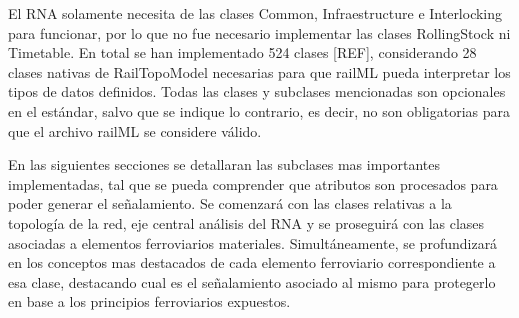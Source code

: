     
    
    
    El RNA solamente necesita de las clases Common, Infraestructure e Interlocking para funcionar, por lo que no fue necesario implementar las clases RollingStock ni Timetable. En total se han implementado 524 clases [REF], considerando 28 clases nativas de RailTopoModel necesarias para que railML pueda interpretar los tipos de datos definidos. Todas las clases y subclases mencionadas son opcionales en el estándar, salvo que se indique lo contrario, es decir, no son obligatorias para que el archivo railML se considere válido.

    En las siguientes secciones se detallaran las subclases mas importantes implementadas, tal que se pueda comprender que atributos son procesados para poder generar el señalamiento. Se comenzará con las clases relativas a la topología de la red, eje central análisis del RNA y se proseguirá con las clases asociadas a elementos ferroviarios materiales. Simultáneamente, se profundizará en los conceptos mas destacados de cada elemento ferroviario correspondiente a esa clase, destacando cual es el señalamiento asociado al mismo para protegerlo en base a los principios ferroviarios expuestos.

    
    

    
    
    
    
    
    
    
    
    
    
    